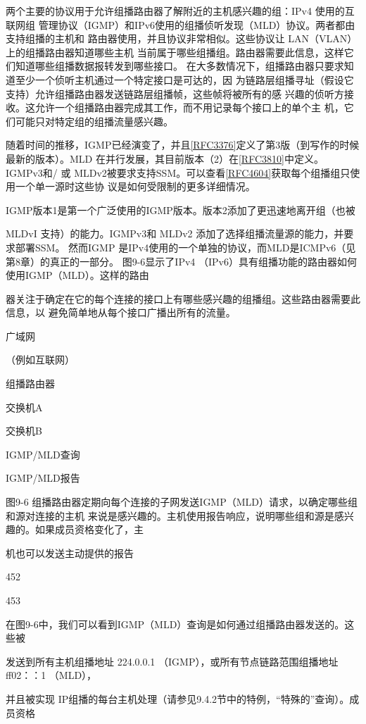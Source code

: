 两个主要的协议用于允许组播路由器了解附近的主机感兴趣的组：IPv4 使用的互联网组
管理协议（IGMP）和IPv6使用的组播侦听发现（MLD）协议。两者都由支持组播的主机和
路由器使用，并且协议非常相似。这些协议让 LAN（VLAN）上的组播路由器知道哪些主机
当前属于哪些组播组。路由器需要此信息，这样它们知道哪些组播数据报转发到哪些接口。
在大多数情况下，组播路由器只要求知道至少一个侦听主机通过一个特定接口是可达的，因
为链路层组播寻址（假设它支持）允许组播路由器发送链路层组播帧，这些帧将被所有的感
兴趣的侦听方接收。这允许一个组播路由器完成其工作，而不用记录每个接口上的单个主
机，它们可能只对特定组的组播流量感兴趣。

随着时间的推移，IGMP已经演变了，并且\href{https://www.rfc-editor.org/rfc/rfc3376}{[RFC3376]}定义了第3版（到写作的时候
最新的版本）。MLD 在并行发展，其目前版本（2）在\href{https://www.rfc-editor.org/rfc/rfc3810}{[RFC3810]}中定义。IGMPv3和/ 或
MLDv2被要求支持SSM。可以查看\href{https://www.rfc-editor.org/rfc/rfc4604}{[RFC4604]}获取每个组播组只使用一个单一源时这些协
议是如何受限制的更多详细情况。

IGMP版本1是第一个广泛使用的IGMP版本。版本2添加了更迅速地离开组（也被

MLDvI 支持）的能力。IGMPv3和 MLDv2 添加了选择组播流量源的能力，并要求部署SSM。
然而IGMP 是IPv4使用的一个单独的协议，而MLD是ICMPv6（见第8章）的真正的一部分。
图9-6显示了IPv4 （IPv6）具有组播功能的路由器如何使用IGMP（MLD）。这样的路由

器关注于确定在它的每个连接的接口上有哪些感兴趣的组播组。这些路由器需要此信息，以
避免简单地从每个接口广播出所有的流量。

广域网

（例如互联网）

组播路由器

交换机A

交换机B

IGMP/MLD查询

IGMP/MLD报告

图9-6 组播路由器定期向每个连接的子网发送IGMP（MLD）请求，以确定哪些组和源对连接的主机
来说是感兴趣的。主机使用报告响应，说明哪些组和源是感兴趣的。如果成员资格变化了，主

机也可以发送主动提供的报告

452

453

在图9-6中，我们可以看到IGMP（MLD）查询是如何通过组播路由器发送的。这些被

发送到所有主机组播地址 224.0.0.1 （IGMP），或所有节点链路范围组播地址 ff02：：1 （MLD），

并且被实现 IP组播的每台主机处理（请参见9.4.2节中的特例，“特殊的”查询）。成员资格

